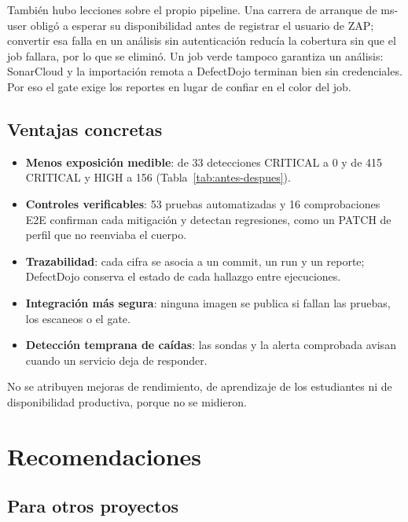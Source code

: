 \documentclass[12pt,a4paper]{article}
\begin{document}
También hubo lecciones sobre el propio pipeline. Una carrera de arranque de ms-user obligó a esperar
su disponibilidad antes de registrar el usuario de ZAP; convertir esa falla en un análisis sin
autenticación reducía la cobertura sin que el job fallara, por lo que se eliminó. Un job verde
tampoco garantiza un análisis: SonarCloud y la importación remota a DefectDojo terminan bien sin
credenciales. Por eso el gate exige los reportes en lugar de confiar en el color del job.

\subsection{Ventajas concretas}

\begin{itemize}[leftmargin=*]
  \item \textbf{Menos exposición medible}: de 33 detecciones CRITICAL a 0 y de 415 CRITICAL y
  HIGH a 156 (Tabla~\ref{tab:antes-despues}).
  \item \textbf{Controles verificables}: 53 pruebas automatizadas y 16 comprobaciones E2E
  confirman cada mitigación y detectan regresiones, como un PATCH de perfil que no reenviaba el
  cuerpo.
  \item \textbf{Trazabilidad}: cada cifra se asocia a un commit, un run y un reporte; DefectDojo
  conserva el estado de cada hallazgo entre ejecuciones.
  \item \textbf{Integración más segura}: ninguna imagen se publica si fallan las pruebas, los
  escaneos o el gate.
  \item \textbf{Detección temprana de caídas}: las sondas y la alerta comprobada avisan cuando un
  servicio deja de responder.
\end{itemize}

No se atribuyen mejoras de rendimiento, de aprendizaje de los estudiantes ni de disponibilidad
productiva, porque no se midieron.

\section{Recomendaciones}
\label{sec:recomendaciones}

\subsection{Para otros proyectos}
\end{document}
